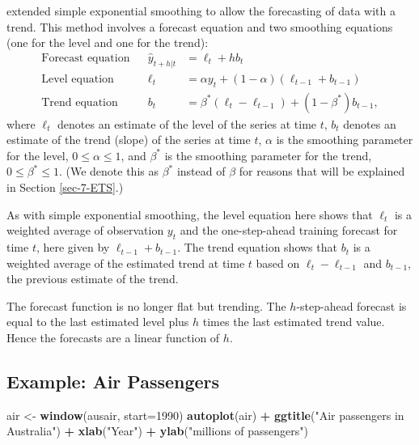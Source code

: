 \documentclass[]{book}
\newenvironment{Shaded}{\begin{snugshade}}{\end{snugshade}}
\newcommand{\DataTypeTok}[1]{\textcolor[rgb]{0.13,0.29,0.53}{#1}}
\newcommand{\DecValTok}[1]{\textcolor[rgb]{0.00,0.00,0.81}{#1}}
\newcommand{\KeywordTok}[1]{\textcolor[rgb]{0.13,0.29,0.53}{\textbf{#1}}}
\newcommand{\NormalTok}[1]{#1}
\newcommand{\OperatorTok}[1]{\textcolor[rgb]{0.81,0.36,0.00}{\textbf{#1}}}
\newcommand{\StringTok}[1]{\textcolor[rgb]{0.31,0.60,0.02}{#1}}
\begin{document}
\citet{Holt57} extended simple exponential smoothing to allow the forecasting of data with a trend. This method involves a forecast equation and two smoothing equations (one for the level and one for the trend):
\begin{align*}
  \text{Forecast equation}&& \hat{y}_{t+h|t} &= \ell_{t} + hb_{t} \\
  \text{Level equation}   && \ell_{t} &= \alpha y_{t} + (1 - \alpha)(\ell_{t-1} + b_{t-1})\\
  \text{Trend equation}   && b_{t}    &= \beta^*(\ell_{t} - \ell_{t-1}) + (1 -\beta^*)b_{t-1},
\end{align*}
where \(\ell_t\) denotes an estimate of the level of the series at time \(t\), \(b_t\) denotes an estimate of the trend (slope) of the series at time \(t\), \(\alpha\) is the smoothing parameter for the level, \(0\le\alpha\le1\), and \(\beta^*\) is the smoothing parameter for the trend, \(0\le\beta^*\le1\). (We denote this as \(\beta^*\) instead of \(\beta\) for reasons that will be explained in Section \ref{sec-7-ETS}.)

As with simple exponential smoothing, the level equation here shows that \(\ell_t\) is a weighted average of observation \(y_t\) and the one-step-ahead training forecast for time \(t\), here given by \(\ell_{t-1} + b_{t-1}\). The trend equation shows that \(b_t\) is a weighted average of the estimated trend at time \(t\) based on \(\ell_{t} - \ell_{t-1}\) and \(b_{t-1}\), the previous estimate of the trend.

The forecast function is no longer flat but trending. The \(h\)-step-ahead forecast is equal to the last estimated level plus \(h\) times the last estimated trend value. Hence the forecasts are a linear function of \(h\).

\hypertarget{example-air-passengers}{%
\subsection*{Example: Air Passengers}\label{example-air-passengers}}

\begin{Shaded}
\begin{Highlighting}[]
\NormalTok{air <-}\StringTok{ }\KeywordTok{window}\NormalTok{(ausair, }\DataTypeTok{start=}\DecValTok{1990}\NormalTok{)}
\KeywordTok{autoplot}\NormalTok{(air) }\OperatorTok{+}
\StringTok{ }\KeywordTok{ggtitle}\NormalTok{(}\StringTok{"Air passengers in Australia"}\NormalTok{) }\OperatorTok{+}
\StringTok{  }\KeywordTok{xlab}\NormalTok{(}\StringTok{"Year"}\NormalTok{) }\OperatorTok{+}\StringTok{ }\KeywordTok{ylab}\NormalTok{(}\StringTok{"millions of passengers"}\NormalTok{)}
\end{Highlighting}
\end{Shaded}
\end{document}
